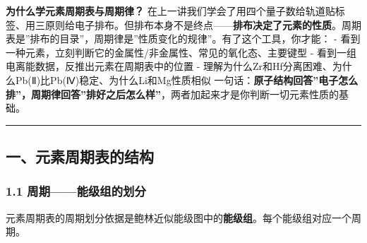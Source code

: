 \documentclass[a4paper,11pt]{ctexart}
\begin{document}
\textbf{为什么学元素周期表与周期律？} 在上一讲我们学会了用四个量子数给轨道贴标签、用三原则给电子排布。但排布本身不是终点------\textbf{排布决定了元素的性质}。周期表是''排布的目录''，周期律是''性质变化的规律''。有了这个工具，你才能：
- 看到一种元素，立刻判断它的金属性/非金属性、常见的氧化态、主要键型
- 看到一组电离能数据，反推出元素在周期表中的位置
- 理解为什么Zr和Hf分离困难、为什么Pb(Ⅱ)比Pb(Ⅳ)稳定、为什么Li和Mg性质相似
一句话：\textbf{原子结构回答''电子怎么排''，周期律回答''排好之后怎么样''}，两者加起来才是你判断一切元素性质的基础。

\begin{center}\rule{0.5\linewidth}{0.5pt}\end{center}

\subsection{一、元素周期表的结构}\label{ux4e00ux5143ux7d20ux5468ux671fux8868ux7684ux7ed3ux6784}

\subsubsection{1.1 周期------能级组的划分}\label{ux5468ux671fux80fdux7ea7ux7ec4ux7684ux5212ux5206}

元素周期表的周期划分依据是鲍林近似能级图中的\textbf{能级组}。每个能级组对应一个周期。
\end{document}
